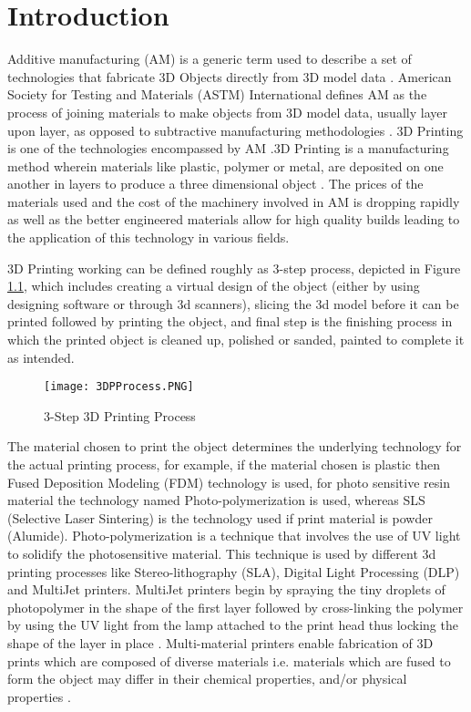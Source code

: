 \chapter{Introduction}
Additive manufacturing (AM) is a generic term used to describe a set of technologies that fabricate 3D Objects directly from 3D model data \cite{KRUTH}. American Society for Testing and Materials (ASTM) International defines AM as the process of joining materials to make objects from 3D model data, usually layer upon layer, as opposed to subtractive manufacturing methodologies \cite{cwig} . 3D Printing is one of the technologies encompassed by AM \cite{Conner}.3D Printing is a manufacturing method  wherein materials like plastic, polymer or metal, are deposited on one another in layers to produce a three dimensional object \cite{sdl}.  The prices of the materials used and the cost of the machinery involved in AM is dropping rapidly as well as the better engineered materials allow for high quality builds leading to the application of this technology in various fields. \newline

3D Printing working can be defined roughly as 3-step process, depicted in Figure \ref{fig:3DP}, which includes creating a virtual design of the object (either by using designing software or through 3d scanners), slicing the 3d model before it can be printed followed by printing the object, and final step is the finishing process in which the printed object is cleaned up, polished or sanded, painted to complete it as intended.  
\begin{figure}[ht!]
\centering
\texttt{[image: 3DPProcess.PNG]}
\caption{3-Step 3D Printing Process}
\label{fig:3DP}
\end{figure}

The material chosen to print the object determines the underlying technology for the actual printing process, for example, if the material chosen is plastic then Fused Deposition Modeling (FDM) technology is used, for photo sensitive resin material the technology named Photo-polymerization is used, whereas SLS (Selective Laser Sintering) is the technology used if print material is powder (Alumide). Photo-polymerization is a technique that involves the use of UV light to solidify the photosensitive material.  This technique is used by different 3d printing processes like Stereo-lithography (SLA), Digital Light Processing (DLP) and MultiJet printers.  MultiJet printers begin by spraying the tiny droplets of photopolymer in the shape of the first layer followed by cross-linking the polymer by using the UV light from the lamp attached to the print head thus locking the shape of the layer in place \cite{dpW}. Multi-material printers enable fabrication of 3D prints which are composed of diverse materials i.e. materials which are fused to form the object may differ in their chemical properties, and/or physical properties \cite{Doubrovski}.\newline

